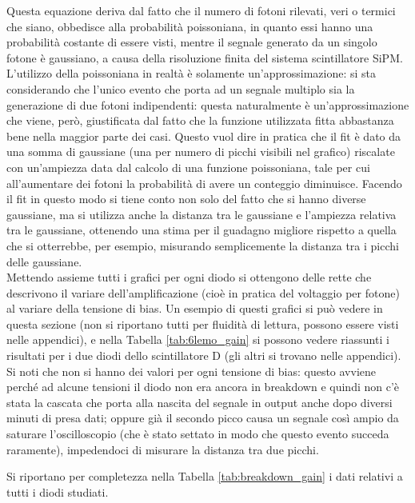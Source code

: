 Questa equazione deriva dal fatto che il numero di fotoni rilevati, veri o termici che siano, obbedisce alla probabilit\`a poissoniana, in quanto essi hanno una probabilit\`a costante di essere visti, mentre il segnale generato da un singolo fotone \`e gaussiano, a causa della risoluzione finita del sistema scintillatore SiPM. L'utilizzo della poissoniana in realtà è solamente un'approssimazione: si sta considerando che l'unico evento che porta ad un segnale multiplo sia la generazione di due fotoni indipendenti: questa naturalmente è un'approssimazione che viene, però, giustificata dal fatto che la funzione utilizzata fitta abbastanza bene nella maggior parte dei casi. Questo vuol dire in pratica che il fit è dato da una somma di gaussiane (una per numero di picchi visibili nel grafico) riscalate con un'ampiezza data dal calcolo di una funzione poissoniana, tale per cui all'aumentare dei fotoni la probabilità di avere un conteggio
diminuisce. Facendo il fit in questo modo si tiene conto non solo del fatto che si hanno diverse gaussiane, ma si utilizza anche la distanza tra le gaussiane e  l'ampiezza
relativa tra le gaussiane, ottenendo una stima per il guadagno migliore rispetto a quella che si otterrebbe, per esempio, misurando semplicemente la distanza tra i picchi delle gaussiane.\\

Mettendo assieme tutti i grafici per ogni diodo si ottengono delle rette che descrivono il variare dell'amplificazione (cioè in pratica del voltaggio per fotone) al variare
della tensione di bias. Un esempio di questi grafici si può vedere in questa sezione (non si riportano tutti per fluidità di lettura, possono essere visti nelle appendici), e nella Tabella \ref{tab:6lemo_gain} si possono vedere riassunti i risultati per i due diodi dello scintillatore D (gli altri si trovano nelle appendici). Si noti che non si hanno dei valori per ogni tensione
di bias: questo avviene perché ad 	alcune tensioni il diodo non era ancora in breakdown e quindi non c'è stata la cascata che porta alla nascita del segnale in output anche dopo diversi minuti di presa dati; oppure gi\`a il secondo picco causa un segnale così ampio da saturare l'oscilloscopio (che è stato settato in modo che questo evento succeda raramente), impedendoci di misurare la distanza tra due picchi.

Si riportano per completezza nella Tabella \ref{tab:breakdown_gain} i dati relativi a tutti i diodi studiati.


